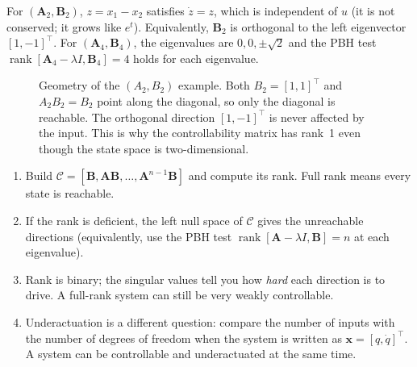 \documentclass[11pt]{article}
\newcommand{\x}{\mathbf{x}}
\newcommand{\A}{\mathbf{A}}
\newcommand{\B}{\mathbf{B}}
\newcommand{\C}{\mathcal{C}}
\begin{document}
For $(\A_2,\B_2)$, $z=x_1-x_2$ satisfies $\dot z=z$, which is independent of
$u$ (it is not conserved; it grows like $e^t$).  Equivalently, $\B_2$ is
orthogonal to the left eigenvector $[1,-1]^\top$.  For $(\A_4,\B_4)$, the
eigenvalues are $0,0,\pm\sqrt2$ and the PBH test
$\operatorname{rank}[\A_4-\lambda I,\B_4]=4$ holds for each eigenvalue.

\begin{figure}[htbp]
\centering
{}
\caption{Geometry of the $(A_2,B_2)$ example.  Both $B_2=[1,1]^\top$ and
$A_2B_2=B_2$ point along the diagonal, so only the diagonal is reachable.
The orthogonal direction $[1,-1]^\top$ is never affected by the input.  This
is why the controllability matrix has rank~1 even though the state space is
two-dimensional.}
\label{fig:controllability}
\end{figure}

\begin{recipe}[title={Testing controllability without guessing}]
\begin{enumerate}[leftmargin=1.4em,itemsep=2pt]
  \item Build $\C=[\B,\A\B,\dots,\A^{n-1}\B]$ and compute its rank.  Full rank
        means every state is reachable.
  \item If the rank is deficient, the left null space of $\C$ gives the
        unreachable directions (equivalently, use the PBH test
        $\operatorname{rank}[\A-\lambda I,\B]=n$ at each eigenvalue).
  \item Rank is binary; the singular values tell you how \emph{hard} each
        direction is to drive.  A full-rank system can still be very weakly
        controllable.
  \item Underactuation is a different question: compare the number of inputs
        with the number of degrees of freedom when the system is written as
        $\x=[q,\dot q]^\top$.  A system can be controllable and
        underactuated at the same time.
\end{enumerate}
\end{recipe}
\end{document}
